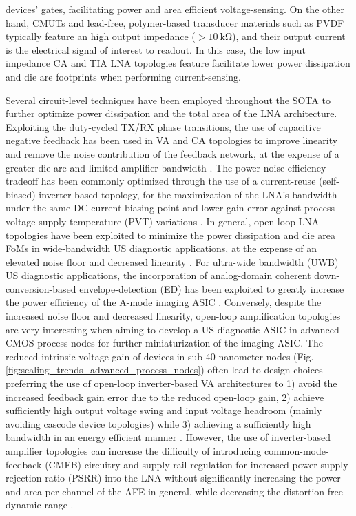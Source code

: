 devices' gates, facilitating power and area efficient voltage-sensing. On the other hand, CMUTs and lead-free, polymer-based transducer materials such as PVDF typically feature an high output impedance ($\mathrm{>10 \ k\Omega}$), and their output current is the electrical signal of interest to readout. In this case, the low input impedance CA  \cite{} and TIA \cite{} LNA topologies feature facilitate lower power dissipation and die are footprints when performing current-sensing. 
\par 
Several circuit-level techniques have been employed throughout the SOTA to further optimize power dissipation and the total area of the LNA architecture. Exploiting the duty-cycled TX/RX phase transitions, the use of capacitive negative feedback has been used in VA and CA topologies to improve linearity and remove the noise contribution of the feedback network, at the expense of a greater die are and limited amplifier bandwidth \cite{}. The power-noise efficiency tradeoff has been commonly optimized through the use of a current-reuse (self-biased) inverter-based topology, for the maximization of the LNA's bandwidth under the same DC current biasing point and lower gain error against process-voltage supply-temperature (PVT) variations \cite{}. In general, open-loop LNA topologies have been exploited to minimize the power dissipation and die area FoMs in wide-bandwidth US diagnostic applications, at the expense of an elevated noise floor and decreased linearity \cite{}. For ultra-wide bandwidth (UWB) US diagnostic applications, the incorporation of analog-domain coherent down-conversion-based envelope-detection (ED) has been exploited to greatly increase the power efficiency of the A-mode imaging ASIC \cite{}.  Conversely, despite the increased noise floor and decreased linearity, open-loop amplification topologies are very interesting when aiming to develop a US diagnostic ASIC in advanced CMOS process nodes for further miniaturization of the imaging ASIC. The reduced intrinsic voltage gain of devices in sub 40 nanometer nodes (Fig. \ref{fig:scaling_trends_advanced_process_nodes}) often lead to design choices preferring the use of open-loop inverter-based VA architectures to 1) avoid the increased feedback gain error due to the reduced open-loop gain, 2) achieve sufficiently high output voltage swing and input voltage headroom (mainly avoiding cascode device topologies) while 3) achieving a sufficiently high bandwidth in an energy efficient manner \cite{}.  However, the use of inverter-based amplifier topologies can increase the difficulty of introducing common-mode-feedback (CMFB) circuitry and supply-rail regulation for increased power supply rejection-ratio (PSRR) into the LNA without significantly increasing the power and area per channel of the AFE in general, while decreasing the distortion-free dynamic range \cite{}. 
\par

